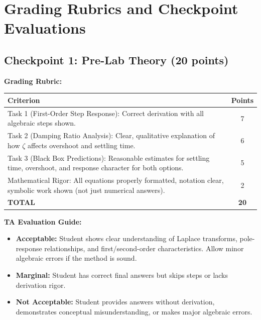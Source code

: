 \documentclass[11pt,letterpaper]{article}
\begin{document}
\section{Grading Rubrics and Checkpoint Evaluations}

\subsection{Checkpoint 1: Pre-Lab Theory (20 points)}

\textbf{Grading Rubric:}

\begin{center}
\begin{tabularx}{0.95\textwidth}{|X|c|}
\hline
\textbf{Criterion} & \textbf{Points} \\
\hline
Task 1 (First-Order Step Response): Correct derivation with all algebraic steps shown. & 7 \\
\hline
Task 2 (Damping Ratio Analysis): Clear, qualitative explanation of how $\zeta$ affects overshoot and settling time. & 6 \\
\hline
Task 3 (Black Box Predictions): Reasonable estimates for settling time, overshoot, and response character for both options. & 5 \\
\hline
Mathematical Rigor: All equations properly formatted, notation clear, symbolic work shown (not just numerical answers). & 2 \\
\hline
\textbf{TOTAL} & \textbf{20} \\
\hline
\end{tabularx}
\end{center}

\noindent
\textbf{TA Evaluation Guide:}

\begin{itemize}
    \item \textbf{Acceptable:} Student shows clear understanding of Laplace transforms, pole-response relationships, and first/second-order characteristics. Allow minor algebraic errors if the method is sound.
    \item \textbf{Marginal:} Student has correct final answers but skips steps or lacks derivation rigor.
    \item \textbf{Not Acceptable:} Student provides answers without derivation, demonstrates conceptual misunderstanding, or makes major algebraic errors.
\end{itemize}
\end{document}
